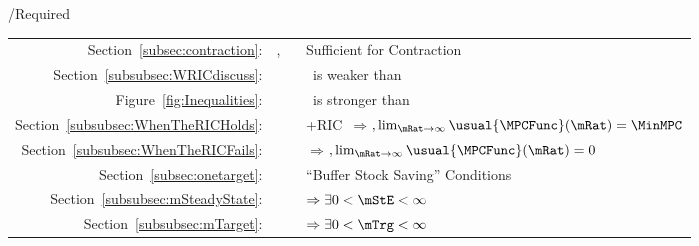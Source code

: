 \documentclass[\econtexRoot/BufferStockTheory]{subfiles}
\begin{document}
\begin{verbatimwrite}{\TableDir/Required}
\begin{table}
{\begin{tabular}{|l|l|l|}
  \\ \cline{2-3}\multicolumn{1}{|r|}{Section~\ref{subsec:contraction}:}                            & \FVAC, \WRIC~                     & Sufficient for Contraction
 \\ \multicolumn{1}{|r|}{Section~\ref{subsubsec:WRICdiscuss}:}                               &                      & \WRIC~is weaker than \RIC~
\\  \multicolumn{1}{|r|}{Figure~\ref{fig:Inequalities}:}                                        &                                 & \FVAC~is stronger than \PFFVAC~
  \\ \multicolumn{1}{|r|}{Section~\ref{subsubsec:WhenTheRICHolds}:}
                                            &                                 & \cncl{\FHWC}+RIC~$\Rightarrow $\GIC$, \lim_{\mRat \rightarrow \infty} \usual{\MPCFunc}(\mRat)=\MinMPC$
  \\  \multicolumn{1}{|r|}{Section~\ref{subsubsec:WhenTheRICFails}:}                                        &                                 & \cncl{\RIC}  $\Rightarrow $\cncl{\FHWC}$, \lim_{\mRat \rightarrow \infty} \usual{\MPCFunc}(\mRat)=0$
  \\ \cline{3-3}\multicolumn{1}{|r|}{Section~\ref{subsec:onetarget}:}                                        &                                 & ``Buffer Stock Saving'' Conditions
  \\ \multicolumn{1}{|r|}{Section~\ref{subsubsec:mSteadyState}:}                                        &                                 & \phantom{-Nrm}{\GIC} $\Rightarrow \exists 0 < \mStE < \infty$ %
  \\ \multicolumn{1}{|r|}{Section~\ref{subsubsec:mTarget}:}                                        &                                 & {\GICNrm} $\Rightarrow \exists 0 < \mTrg < \infty$ %
                                                                                  

\end{tabular}}
\end{table}
\end{verbatimwrite}
\end{document}
